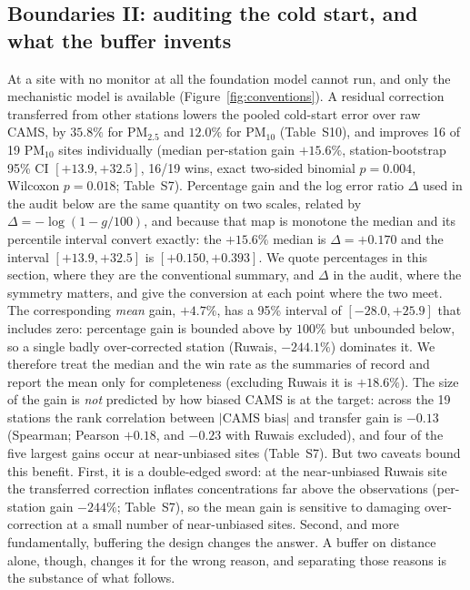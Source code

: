 \documentclass[review,times,authoryear]{elsarticle}
\newcommand*{\pmtf}{\ensuremath{\mathrm{PM_{2.5}}}}
\newcommand*{\pmten}{\ensuremath{\mathrm{PM_{10}}}}
\begin{document}
\subsection{Boundaries II: auditing the cold start, and what the buffer invents}
At a site with no monitor at all the foundation model cannot run, and only the mechanistic model is available (Figure~\ref{fig:conventions}). A residual correction transferred from other stations lowers the pooled cold-start error over raw CAMS, by $35.8\%$ for \pmtf{} and $12.0\%$ for \pmten{} (Table~S10), and improves 16 of 19 \pmten{} sites individually (median per-station gain $+15.6\%$, station-bootstrap 95\% CI $[+13.9,+32.5]$, 16/19 wins, exact two-sided binomial $p=0.004$, Wilcoxon $p=0.018$; Table~S7). Percentage gain and the log error ratio $\Delta$ used in the audit below are the same quantity on two scales, related by $\Delta=-\log(1-g/100)$, and because that map is monotone the median and its percentile interval convert exactly: the $+15.6\%$ median is $\Delta=+0.170$ and the interval $[+13.9,+32.5]$ is $[+0.150,+0.393]$. We quote percentages in this section, where they are the conventional summary, and $\Delta$ in the audit, where the symmetry matters, and give the conversion at each point where the two meet. The corresponding \emph{mean} gain, $+4.7\%$, has a 95\% interval of $[-28.0,+25.9]$ that includes zero: percentage gain is bounded above by $100\%$ but unbounded below, so a single badly over-corrected station (Ruwais, $-244.1\%$) dominates it. We therefore treat the median and the win rate as the summaries of record and report the mean only for completeness (excluding Ruwais it is $+18.6\%$). The size of the gain is \emph{not} predicted by how biased CAMS is at the target: across the 19 stations the rank correlation between $|\text{CAMS bias}|$ and transfer gain is $-0.13$ (Spearman; Pearson $+0.18$, and $-0.23$ with Ruwais excluded), and four of the five largest gains occur at near-unbiased sites (Table~S7). But two caveats bound this benefit. First, it is a double-edged sword: at the near-unbiased Ruwais site the transferred correction inflates concentrations far above the observations (per-station gain $-244\%$; Table~S7), so the mean gain is sensitive to damaging over-correction at a small number of near-unbiased sites. Second, and more fundamentally, buffering the design changes the answer. A buffer on distance alone, though, changes it for the wrong reason, and separating those reasons is the substance of what follows.
\end{document}
